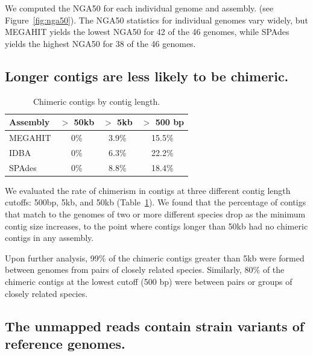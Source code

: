 \documentclass[10pt,a4paper,twocolumn]{article}
\begin{document}
We computed the NGA50 for each individual genome and assembly.  (see
Figure~\ref{fig:nga50}).  The NGA50 statistics for individual genomes
vary widely, but MEGAHIT yields the lowest NGA50 for 42 of the 46
genomes, while SPAdes yields the highest NGA50 for 38 of the 46 genomes.

\subsection*{Longer contigs are less likely to be chimeric.}

\begin{table}[!h]
\centering
\caption{Chimeric contigs by contig length.}
\begin{tabular}{|l|c|c|c|}\hline
\textbf{Assembly} & \textbf {$>$ 50kb} & \textbf {$>$ 5kb} & \textbf{$>$ 500 bp}
\\ \hline

MEGAHIT      & 0\% & 3.9\% & 15.5\% \\ 
IDBA   & 0\% & 6.3\% & 22.2\% \\
SPAdes    & 0\% & 8.8\% & 18.4\% \\
\hline

\end{tabular}
\label{table:contig-chimera}

\end{table}

We evaluated the rate of chimerism
in contigs at three different contig length cutoffs: 500bp, 5kb,
and 50kb (Table~\ref{table:contig-chimera}).  We found that the
percentage of contigs that match to the genomes of two or more
different species drop as the minimum contig size increases, to the
point where contigs longer than 50kb had no chimeric contigs in any
assembly.

Upon further analysis, 99\% of the chimeric contigs greater than 5kb
were formed between genomes from pairs of closely related species.
Similarly, 80\% of the chimeric contigs at the lowest cutoff (500 bp)
were between pairs or groups of closely related species.



\subsection*{The unmapped reads contain strain variants of reference genomes.}
\end{document}
